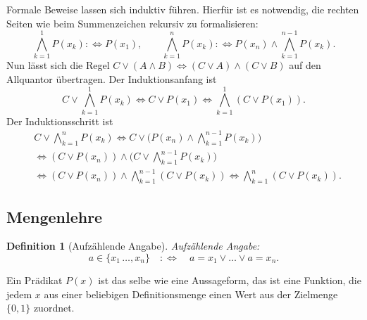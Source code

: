 \documentclass[a4paper,11pt,fleqn,twoside]{scrartcl}
\numberwithin{equation}{section}
\theoremstyle{rmbox}
\newtheorem{Definition}{Definition}
\newcommand{\emdef}[1]{\emph{#1}}
\begin{document}
Formale Beweise lassen sich induktiv führen. Hierfür ist es notwendig,
die rechten Seiten wie beim Summenzeichen rekursiv zu formalisieren:
\begin{equation}
\bigwedge_{k=1}^1 P(x_k) :\Longleftrightarrow P(x_1),\qquad
\bigwedge_{k=1}^n P(x_k) :\Longleftrightarrow P(x_n)\land\bigwedge_{k=1}^{n-1} P(x_k).
\end{equation}
Nun lässt sich die Regel $C\lor (A\land B)\iff (C\lor A)\land(C\lor B)$
auf den Allquantor übertragen. Der Induktionsanfang ist
\begin{equation}
C\lor\bigwedge_{k=1}^1 P(x_k) \iff C\lor P(x_1) \iff \bigwedge_{k=1}^1 (C\lor P(x_1)).
\end{equation}
Der Induktionsschritt ist
\begin{align}
& C\lor\!\bigwedge_{k=1}^n P(x_k)
\iff C\lor\bigg(P(x_n)\land\bigwedge_{k=1}^{n-1} P(x_k)\bigg)\\
&\iff (C\lor P(x_n))\land\bigg(C\lor\!\bigwedge_{k=1}^{n-1} P(x_k)\bigg)\\
&\iff (C\lor P(x_n))\land\bigwedge_{k=1}^{n-1} (C\lor P(x_k))
\iff \bigwedge_{k=1}^{n} (C\lor P(x_k)).
\end{align}
\subsection{Mengenlehre}

\begin{Definition}[Aufzählende Angabe]
\emdef{Aufzählende Angabe}:
\begin{equation}
a\in\{x_1\,\ldots,x_n\} \quad:\Longleftrightarrow\quad
a=x_1\lor\ldots\lor a=x_n.
\end{equation}
\end{Definition}

\noindent
Ein Prädikat $P(x)$ ist das selbe wie eine Aussageform, das ist eine
Funktion, die jedem $x$ aus einer beliebigen Definitionsmenge
einen Wert aus der Zielmenge $\{0,1\}$ zuordnet.
\end{document}
